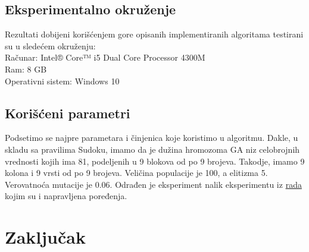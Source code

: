 \documentclass[a4paper]{article}
\begin{document}
\subsection{Eksperimentalno okruženje}
Rezultati dobijeni korišćenjem gore opisanih implementiranih algoritama testirani su u sledećem okruženju:\\ 
Računar: Intel® Core™ i5 Dual Core Processor 4300M \\
Ram: 8 GB \\
Operativni sistem: Windows 10 \\

\subsection{Korišćeni parametri}
Podsetimo se najpre parametara i činjenica koje koristimo u algoritmu. Dakle, u skladu sa pravilima Sudoku, imamo da je dužina hromozoma GA niz celobrojnih vrednosti kojih ima 81, podeljenih u 9 blokova od po 9 brojeva. Takodje, imamo 9 kolona i 9 vrsti od po 9 brojeva. 
Veličina populacije je 100, a elitizma 5. Verovatnoća mutacije je 0.06. Odrađen je eksperiment nalik eksperimentu iz \href{https://seco.cs.aalto.fi/publications/2006/hyvonen-et-al-developments-in-artificial-intelligence-and-the-semantic-web-step-2006.pdf#page=91}{rada} kojim su i napravljena poređenja.
 




\section{Zaključak}




\appendix
 

\end{document}
